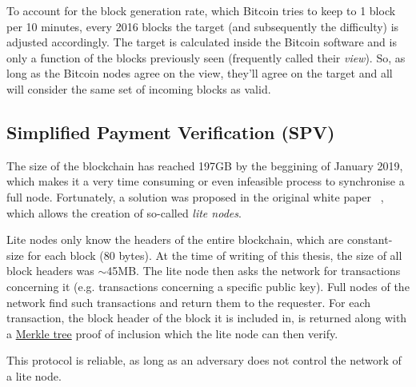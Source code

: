 To account for the block generation rate, which Bitcoin tries to keep to 1 block per 10 minutes, every 2016 blocks the target (and subsequently the difficulty) is adjusted accordingly. The target is calculated inside the Bitcoin software and is only a function of the blocks previously seen (frequently called their \emph{view}). So, as long as the Bitcoin nodes agree on the view, they'll agree on the target and all will consider the same set of incoming blocks as valid.


\subsection{Simplified Payment Verification (SPV)}
The size of the blockchain has reached 197GB by the beggining of January 2019, which makes it a very time consuming or even infeasible process to synchronise a full node. Fortunately, a solution was proposed in the original white paper ~\cite{Nakamoto_bitcoin:a}, which allows the creation of so-called \emph{lite nodes}.

Lite nodes only know the headers of the entire blockchain, which are constant-size for each block (80 bytes). At the time of writing of this thesis, the size of all block headers was $\sim$45MB. The lite node then asks the network for transactions concerning it (e.g. transactions concerning a specific public key). Full nodes of the network find such transactions and return them to the requester. For each transaction, the block header of the block it is included in, is returned along with a \hyperref[sec:merkle-trees]{Merkle tree} proof of inclusion which the lite node can then verify.

This protocol is reliable, as long as an adversary does not control the network of a lite node.


